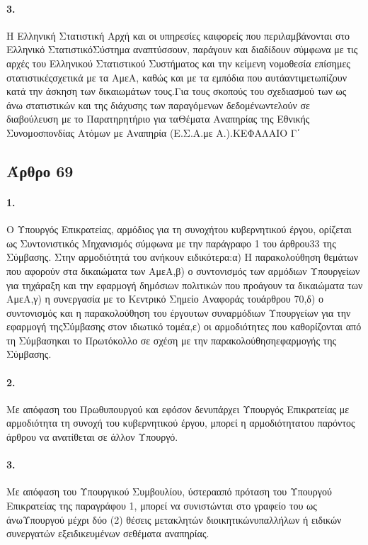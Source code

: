 \documentclass[a4paper,oneside, 10pt]{book}
\begin{document}
\paragraph { 3. } Η Ελληνική Στατιστική Αρχή και οι υπηρεσίες καιφορείς που περιλαμβάνονται στο Ελληνικό ΣτατιστικόΣύστημα αναπτύσσουν, παράγουν και διαδίδουν σύμφωνα με τις αρχές του Ελληνικού Στατιστικού Συστήματος και την κείμενη νομοθεσία επίσημες στατιστικέςσχετικά με τα ΑμεΑ, καθώς και με τα εμπόδια που αυτάαντιμετωπίζουν κατά την άσκηση των δικαιωμάτων τους.Για τους σκοπούς του σχεδιασμού των ως άνω στατιστικών και της διάχυσης των παραγόμενων δεδομένωντελούν σε διαβούλευση με το Παρατηρητήριο για ταΘέματα Αναπηρίας της Εθνικής Συνομοσπονδίας Ατόμων με Αναπηρία (Ε.Σ.Α.με Α.).ΚΕΦΑΛΑΙΟ Γ΄
\subsection*{ Άρθρο 69 }
\paragraph { 1. } Ο Υπουργός Επικρατείας, αρμόδιος για τη συνοχήτου κυβερνητικού έργου, ορίζεται ως Συντονιστικός Μηχανισμός σύμφωνα με την παράγραφο 1 του άρθρου33 της Σύμβασης. Στην αρμοδιότητά του ανήκουν ειδικότερα:α) Η παρακολούθηση θεμάτων που αφορούν στα δικαιώματα των ΑμεΑ,β) ο συντονισμός των αρμόδιων Υπουργείων για τηχάραξη και την εφαρμογή δημόσιων πολιτικών που προάγουν τα δικαιώματα των ΑμεΑ,γ) η συνεργασία με το Κεντρικό Σημείο Αναφοράς τουάρθρου 70,δ) ο συντονισμός και η παρακολούθηση του έργουτων συναρμόδιων Υπουργείων για την εφαρμογή τηςΣύμβασης στον ιδιωτικό τομέα,ε) οι αρμοδιότητες που καθορίζονται από τη Σύμβασηκαι το Πρωτόκολλο σε σχέση με την παρακολούθησηεφαρμογής της Σύμβασης.
\paragraph { 2. } Με απόφαση του Πρωθυπουργού και εφόσον δενυπάρχει Υπουργός Επικρατείας με αρμοδιότητα τη συνοχή του κυβερνητικού έργου, μπορεί η αρμοδιότητατου παρόντος άρθρου να ανατίθεται σε άλλον Υπουργό.
\paragraph { 3. } Με απόφαση του Υπουργικού Συμβουλίου, ύστερααπό πρόταση του Υπουργού Επικρατείας της παραγράφου 1, μπορεί να συνιστώνται στο γραφείο του ως άνωΥπουργού μέχρι δύο (2) θέσεις μετακλητών διοικητικώνυπαλλήλων ή ειδικών συνεργατών εξειδικευμένων σεθέματα αναπηρίας.
\end{document}
